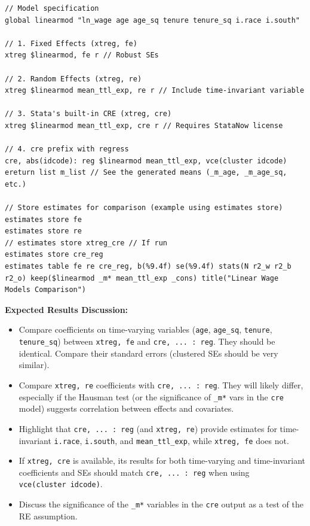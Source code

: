 \documentclass[bib]{statapress}
\providecommand{\tightlist}{%
  \setlength{\itemsep}{0pt}\setlength{\parskip}{0pt}}\usepackage{longtable,booktabs,array}
\begin{document}
\begin{verbatim}
// Model specification
global linearmod "ln_wage age age_sq tenure tenure_sq i.race i.south"

// 1. Fixed Effects (xtreg, fe)
xtreg $linearmod, fe r // Robust SEs

// 2. Random Effects (xtreg, re)
xtreg $linearmod mean_ttl_exp, re r // Include time-invariant variable

// 3. Stata's built-in CRE (xtreg, cre)
xtreg $linearmod mean_ttl_exp, cre r // Requires StataNow license

// 4. cre prefix with regress
cre, abs(idcode): reg $linearmod mean_ttl_exp, vce(cluster idcode)
ereturn list m_list // See the generated means (_m_age, _m_age_sq, etc.)

// Store estimates for comparison (example using estimates store)
estimates store fe
estimates store re
// estimates store xtreg_cre // If run
estimates store cre_reg
estimates table fe re cre_reg, b(%9.4f) se(%9.4f) stats(N r2_w r2_b r2_o) keep($linearmod _m* mean_ttl_exp _cons) title("Linear Wage Models Comparison")
\end{verbatim}

\textbf{Expected Results Discussion:}

\begin{itemize}
\tightlist
\item
  Compare coefficients on time-varying variables (\texttt{age},
  \texttt{age\_sq}, \texttt{tenure}, \texttt{tenure\_sq}) between
  \texttt{xtreg,\ fe} and \texttt{cre,\ ...\ :\ reg}. They should be
  identical. Compare their standard errors (clustered SEs should be very
  similar).
\item
  Compare \texttt{xtreg,\ re} coefficients with
  \texttt{cre,\ ...\ :\ reg}. They will likely differ, especially if the
  Hausman test (or the significance of \texttt{\_m*} vars in the
  \texttt{cre} model) suggests correlation between effects and
  covariates.
\item
  Highlight that \texttt{cre,\ ...\ :\ reg} (and \texttt{xtreg,\ re})
  provide estimates for time-invariant \texttt{i.race},
  \texttt{i.south}, and \texttt{mean\_ttl\_exp}, while
  \texttt{xtreg,\ fe} does not.
\item
  If \texttt{xtreg,\ cre} is available, its results for both
  time-varying and time-invariant coefficients and SEs should match
  \texttt{cre,\ ...\ :\ reg} when using \texttt{vce(cluster\ idcode)}.
\item
  Discuss the significance of the \texttt{\_m*} variables in the
  \texttt{cre} output as a test of the RE assumption.
\end{itemize}
\end{document}
